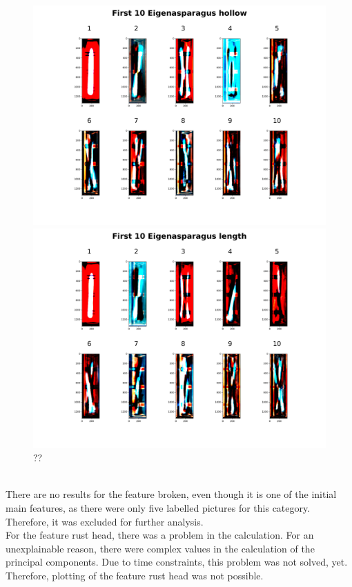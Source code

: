 \begin{figure}[h]
	\centering
	\includegraphics[scale=0.05]{Figures/chapter04/pc_hollow}
	\decoRule
	\caption[??]{??}
	\label{fig:PrincipalComponentHollow}
\bigbreak
	\includegraphics[scale=0.05]{Figures/chapter04/pc_length}
	\decoRule
	\caption[??]{??}
	\label{fig:PrincipalComponentLength}
\end{figure}
\\
There are no results for the feature broken, even though it is one of the initial main features, as there were only five labelled pictures for this category. Therefore, it was excluded for further analysis. \\
For the feature rust head, there was a problem in the calculation. For an unexplainable reason, there were complex values in the calculation of the principal components. Due to time constraints, this problem was not solved, yet. Therefore, plotting of the feature rust head was not possible. \\

